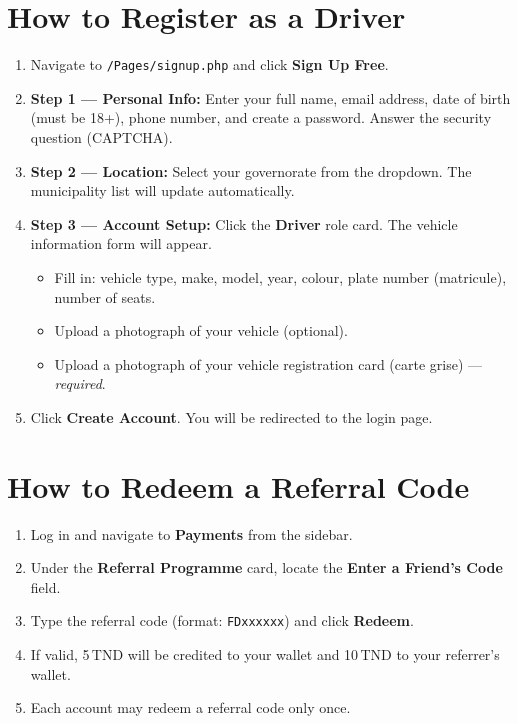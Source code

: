 \documentclass[12pt,a4paper,openright]{report}
\begin{document}
\section*{How to Register as a Driver}

\begin{enumerate}[noitemsep]
    \item Navigate to \texttt{/Pages/signup.php} and click \textbf{Sign Up Free}.
    \item \textbf{Step 1 — Personal Info:} Enter your full name, email address, date of birth (must be 18+), phone number, and create a password. Answer the security question (CAPTCHA).
    \item \textbf{Step 2 — Location:} Select your governorate from the dropdown. The municipality list will update automatically.
    \item \textbf{Step 3 — Account Setup:} Click the \textbf{Driver} role card. The vehicle information form will appear.
    \begin{itemize}[noitemsep]
        \item Fill in: vehicle type, make, model, year, colour, plate number (matricule), number of seats.
        \item Upload a photograph of your vehicle (optional).
        \item Upload a photograph of your vehicle registration card (carte grise) --- \textit{required}.
    \end{itemize}
    \item Click \textbf{Create Account}. You will be redirected to the login page.
\end{enumerate}

\section*{How to Redeem a Referral Code}

\begin{enumerate}[noitemsep]
    \item Log in and navigate to \textbf{Payments} from the sidebar.
    \item Under the \textbf{Referral Programme} card, locate the \textbf{Enter a Friend's Code} field.
    \item Type the referral code (format: \texttt{FDxxxxxx}) and click \textbf{Redeem}.
    \item If valid, 5\,TND will be credited to your wallet and 10\,TND to your referrer's wallet.
    \item Each account may redeem a referral code only once.
\end{enumerate}

\end{document}

